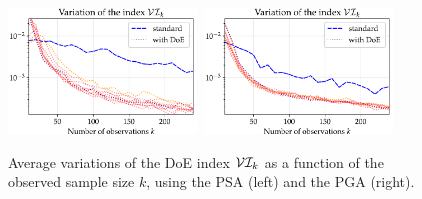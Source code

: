     
    
    
    
    \begin{figure}[h]
        \centering%
        \includegraphics[width=5cm]{figures/DoE/VariaI_PSA.pdf}\ 
        \includegraphics[width=5cm]{figures/DoE/VariaI_PGA.pdf}
        \caption{Average variations of the DoE index $\mathcal{V}\mathcal{I}_k$ as a function of the observed sample size $k$, using the PSA (left) and the PGA (right).}
        \label{fig:doe:variaI}
    \end{figure}
    
